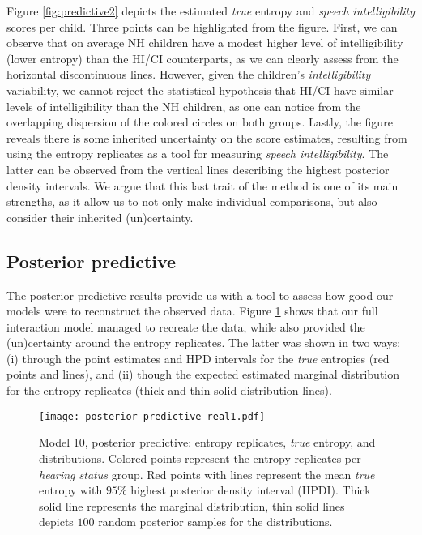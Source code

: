 Figure \ref{fig:predictive2} depicts the estimated \textit{true} entropy and \textit{speech intelligibility} scores per child. Three points can be highlighted from the figure. First, we can observe that on average NH children have a modest higher level of intelligibility (lower entropy) than the HI/CI counterparts, as we can clearly assess from the horizontal discontinuous lines. However, given the children's \textit{intelligibility} variability, we cannot reject the statistical hypothesis that HI/CI have similar levels of intelligibility than the NH children, as one can notice from the overlapping dispersion of the colored circles on both groups. Lastly, the figure reveals there is some inherited uncertainty on the score estimates, resulting from using the entropy replicates as a tool for measuring \textit{speech intelligibility}. The latter can be observed from the vertical lines describing the highest posterior density intervals. We argue that this last trait of the method is one of its main strengths, as it allow us to not only make individual comparisons, but also consider their inherited (un)certainty.
%
%
\subsection{Posterior predictive} \label{sS:results_posterior}
%
The posterior predictive results provide us with a tool to assess how good our models were to reconstruct the observed data. Figure \ref{fig:predictive1} shows that our full interaction model managed to recreate the data, while also provided the (un)certainty around the entropy replicates. The latter was shown in two ways: (i) through the point estimates and HPD intervals for the \textit{true} entropies (red points and lines), and (ii) though the expected estimated marginal distribution for the entropy replicates (thick and thin solid distribution lines).
%
\begin{figure}[!h]
	\centering
	\texttt{[image: posterior\_predictive\_real1.pdf]}
	\caption[Model 10, posterior predictive: entropy replicates, \textit{true} entropy, and distributions]{Model 10, posterior predictive: entropy replicates, \textit{true} entropy, and distributions. Colored points represent the entropy replicates per \textit{hearing status} group. Red points with lines represent the mean \textit{true} entropy with $95\%$ highest posterior density interval (HPDI). Thick solid line represents the marginal distribution, thin solid lines depicts $100$ random posterior samples for the distributions.}
	\label{fig:predictive1}
\end{figure}
%
%
